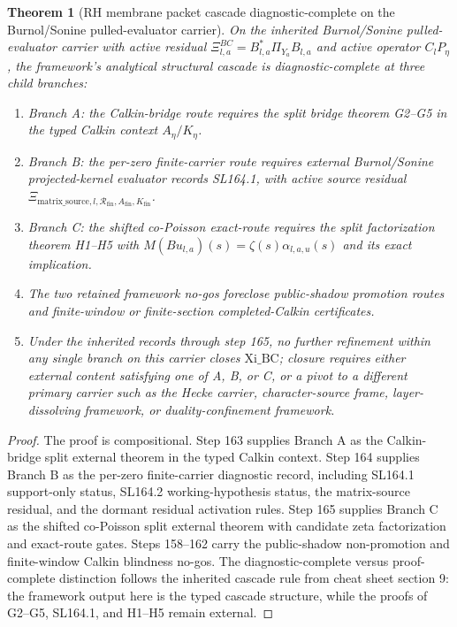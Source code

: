 \documentclass[11pt]{article}
\newtheorem{theorem}{Theorem}
\newcommand{\XiBC}{\Xi^{BC}_{l,a}}
\newcommand{\Aeta}{A_\eta}
\newcommand{\Keta}{K_\eta}
\newcommand{\Rhofin}{\mathcal R_{\mathrm{fin}}}
\begin{document}
\begin{theorem}[RH membrane packet cascade diagnostic-complete on the Burnol/Sonine pulled-evaluator carrier]
On the inherited Burnol/Sonine pulled-evaluator carrier with active residual
\(\XiBC=B^*_{l,a}\Pi_{Y_a}B_{l,a}\) and active operator \(C_lP_\eta\), the framework's analytical structural cascade is diagnostic-complete at three child branches:
\begin{enumerate}[label=(\alph*)]
\item Branch A: the Calkin-bridge route requires the split bridge theorem G2--G5 in the typed Calkin context \(\Aeta/\Keta\).
\item Branch B: the per-zero finite-carrier route requires external Burnol/Sonine projected-kernel evaluator records SL164.1, with active source residual \(\Xi_{\mathrm{matrix\_source},l,\Rhofin,A_{\mathrm{fin}},K_{\mathrm{fin}}}\).
\item Branch C: the shifted co-Poisson exact-route requires the split factorization theorem H1--H5 with \(M(Bu_{l,a})(s)=\zeta(s)\alpha_{l,a,u}(s)\) and its exact implication.
\item The two retained framework no-gos foreclose public-shadow promotion routes and finite-window or finite-section completed-Calkin certificates.
\item Under the inherited records through step 165, no further refinement within any single branch on this carrier closes \(\mathrm{Xi\_BC}\); closure requires either external content satisfying one of A, B, or C, or a pivot to a different primary carrier such as the Hecke carrier, character-source frame, layer-dissolving framework, or duality-confinement framework.
\end{enumerate}
\end{theorem}

\begin{proof}
The proof is compositional. Step 163 supplies Branch A as the Calkin-bridge split external theorem in the typed Calkin context. Step 164 supplies Branch B as the per-zero finite-carrier diagnostic record, including SL164.1 support-only status, SL164.2 working-hypothesis status, the matrix-source residual, and the dormant residual activation rules. Step 165 supplies Branch C as the shifted co-Poisson split external theorem with candidate zeta factorization and exact-route gates. Steps 158--162 carry the public-shadow non-promotion and finite-window Calkin blindness no-gos. The diagnostic-complete versus proof-complete distinction follows the inherited cascade rule from cheat sheet section 9: the framework output here is the typed cascade structure, while the proofs of G2--G5, SL164.1, and H1--H5 remain external.
\end{proof}
\end{document}
